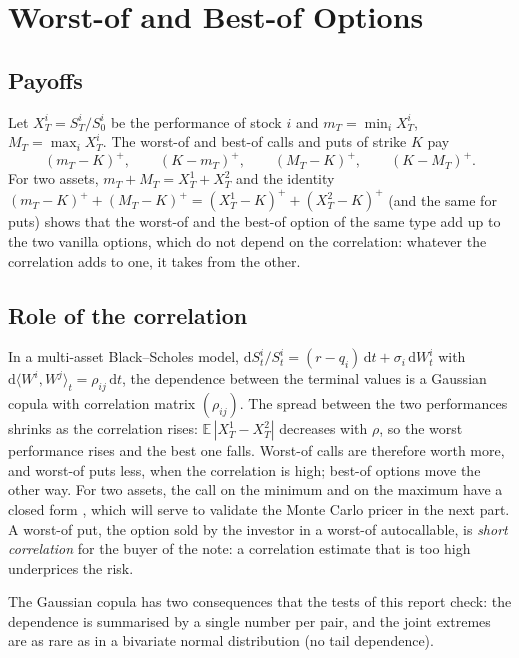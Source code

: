 \documentclass[11pt,a4paper]{article}
\newcommand{\E}{\mathbb{E}}
\newcommand{\dd}{\mathrm{d}}
\begin{document}
\section{Worst-of and Best-of Options}\label{sec:wobo}

\subsection{Payoffs}
Let $X^i_T = S^i_T / S^i_0$ be the performance of stock $i$ and $m_T = \min_i X^i_T$, $M_T = \max_i X^i_T$. The
worst-of and best-of calls and puts of strike $K$ pay
\begin{equation}
(m_T - K)^+,\qquad (K - m_T)^+,\qquad (M_T - K)^+,\qquad (K - M_T)^+.
\end{equation}
For two assets, $m_T + M_T = X^1_T + X^2_T$ and the identity
$(m_T - K)^+ + (M_T - K)^+ = (X^1_T - K)^+ + (X^2_T - K)^+$ (and the same for puts) shows that the worst-of and the
best-of option of the same type add up to the two vanilla options, which do not depend on the correlation: whatever
the correlation adds to one, it takes from the other.

\subsection{Role of the correlation}
In a multi-asset Black--Scholes model, $\dd S^i_t / S^i_t = (r - q_i)\,\dd t + \sigma_i\,\dd W^i_t$ with
$\dd\langle W^i, W^j\rangle_t = \rho_{ij}\,\dd t$, the dependence between the terminal values is a Gaussian copula
with correlation matrix $(\rho_{ij})$. The spread between the two performances shrinks as the correlation rises:
$\E\,|X^1_T - X^2_T|$ decreases with $\rho$, so the worst performance rises and the best one falls. Worst-of calls are
therefore worth more, and worst-of puts less, when the correlation is high; best-of options move the other way. For
two assets, the call on the minimum and on the maximum have a closed form \cite{stulz1982}, which will serve to
validate the Monte Carlo pricer in the next part. A worst-of put, the option sold by the investor in a worst-of
autocallable, is \emph{short correlation} for the buyer of the note: a correlation estimate that is too high
underprices the risk.

The Gaussian copula has two consequences that the tests of this report check: the dependence is summarised by a
single number per pair, and the joint extremes are as rare as in a bivariate normal distribution (no tail dependence).
\end{document}
